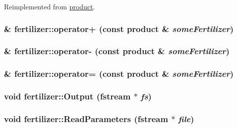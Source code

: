 Reimplemented from \hyperlink{classproduct_afcbfb1feadfd4ed057845eab47e37ff5}{product}.\hypertarget{classfertilizer_ab60a32c311094dbea502b2f36889e78d}{
\subsubsection[{operator+}]{ \& fertilizer::operator+ (const {\bf product} \& {\em someFertilizer})}}
\label{classfertilizer_ab60a32c311094dbea502b2f36889e78d}
\hypertarget{classfertilizer_ae3de37192bdc295effb86ed271bd6855}{
\subsubsection[{operator-\/}]{ \& fertilizer::operator-\/ (const {\bf product} \& {\em someFertilizer})}}
\label{classfertilizer_ae3de37192bdc295effb86ed271bd6855}
\hypertarget{classfertilizer_a1da114796fa3f51994befbbf778dbb70}{
\subsubsection[{operator=}]{ \& fertilizer::operator= (const {\bf product} \& {\em someFertilizer})}}
\label{classfertilizer_a1da114796fa3f51994befbbf778dbb70}
\hypertarget{classfertilizer_a2b7b0ff767e32cca1f77fa5cc48ee1ab}{
\subsubsection[{Output}]{\setlength{\rightskip}{0pt plus 5cm}void fertilizer::Output (fstream $\ast$ {\em fs})}}
\label{classfertilizer_a2b7b0ff767e32cca1f77fa5cc48ee1ab}
\hypertarget{classfertilizer_a4aeba843a60b5826ca016f922917985f}{
\subsubsection[{ReadParameters}]{\setlength{\rightskip}{0pt plus 5cm}void fertilizer::ReadParameters (fstream $\ast$ {\em file})}}
\label{classfertilizer_a4aeba843a60b5826ca016f922917985f}


